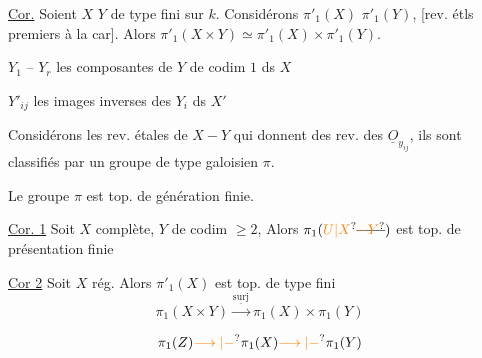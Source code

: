 \uline{Cor.} Soient $X$ $Y$ de type fini sur $k$. Considérons
$\pi'_1(X)$  $\pi'_1(Y)$,  [rev. étls premiers à la car].
Alors $\pi'_1(X\times Y)\simeq\pi'_1(X)\times\pi'_1(Y)$.

$Y_1$ -- $Y_r$ les composantes de $Y$ de codim $1$ ds $X$

$Y'_{ij}$ les images inverses des $Y_i$ ds $X'$

 Considérons les rev. étales de $X-Y$ qui
 donnent des rev.  des $\underline{O}_{y_{ij}}$,
ils sont classifiés par un groupe de type galoisien $\pi$.

\uline{} Le groupe $\pi$ est top. de génération finie.

\uline{Cor. 1} Soit $X$ complète, $Y$ de codim $\geq 2$,  Alors $\pi_1(\unsure{U|X}\deleted{\unsure{-Y}})$
est top. de présentation finie

\uline{Cor 2} Soit $X$  rég. Alors $\pi'_1(X)$ est top. de
type fini
\[
\pi_1(X\times Y)\xrightarrow{\underline{\mathrm{surj}}}\pi_1(X)\times\pi_1(Y)
\]


\[
\pi_1(Z)\unsure{\longrightarrow|-}\pi_1(X)\unsure{\longrightarrow|-}\pi_1(Y)
\]


